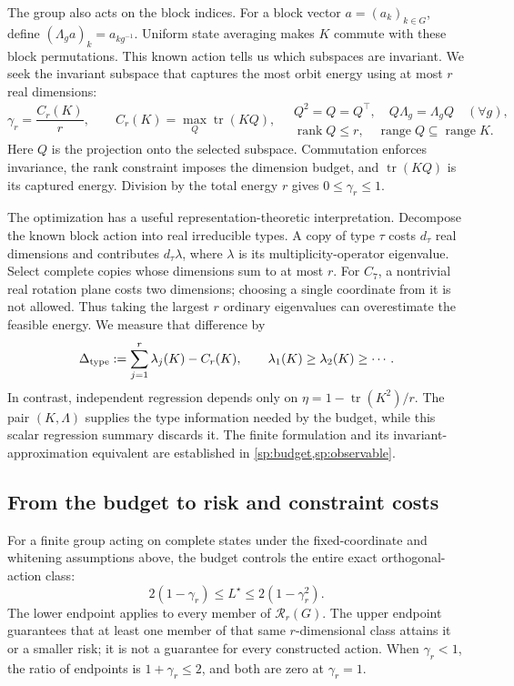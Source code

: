 The group also acts on the block indices. For a block vector $a=(a_k)_{k\in G}$, define $(\Lambda_g a)_k=a_{kg^{-1}}$. Uniform state averaging makes $K$ commute with these block permutations. This known action tells us which subspaces are invariant. We seek the invariant subspace that captures the most orbit energy using at most $r$ real dimensions:
\begin{equation}
 \gamma_r=\frac{C_r(K)}r,\qquad
 C_r(K)=\max_Q\operatorname{tr}(KQ),\quad
 \begin{gathered}
 Q^2=Q=Q^\top,\quad Q\Lambda_g=\Lambda_gQ\quad(\forall g),\\
 \operatorname{rank}Q\le r,\quad\operatorname{range}Q\subseteq\operatorname{range}K.
 \end{gathered}
 \label{eq:budget-main}
\end{equation}
Here $Q$ is the projection onto the selected subspace. Commutation enforces invariance, the rank constraint imposes the dimension budget, and $\operatorname{tr}(KQ)$ is its captured energy. Division by the total energy $r$ gives $0\le\gamma_r\le1$.

The optimization has a useful representation-theoretic interpretation. Decompose the known block action into real irreducible types. A copy of type $\tau$ costs $d_\tau$ real dimensions and contributes $d_\tau\lambda$, where $\lambda$ is its multiplicity-operator eigenvalue. Select complete copies whose dimensions sum to at most $r$. For $C_7$, a nontrivial real rotation plane costs two dimensions; choosing a single coordinate from it is not allowed. Thus taking the largest $r$ ordinary eigenvalues can overestimate the feasible energy. We measure that difference by
\[
 \Delta_{\rm type}:=\sum_{j=1}^{r}\lambda_j(K)-C_r(K),
 \qquad \lambda_1(K)\ge\lambda_2(K)\ge\cdots.
\]
In contrast, independent regression depends only on $\eta=1-\operatorname{tr}(K^2)/r$. The pair $(K,\Lambda)$ supplies the type information needed by the budget, while this scalar regression summary discards it. The finite formulation and its invariant-approximation equivalent are established in \cref{sp:budget,sp:observable}.

\subsection{From the budget to risk and constraint costs}
For a finite group acting on complete states under the fixed-coordinate and whitening assumptions above, the budget controls the entire exact orthogonal-action class:
\begin{equation}
 \boxed{2(1-\gamma_r)\le L^\star\le2(1-\gamma_r^2).}
 \label{eq:main-risk-bound}
\end{equation}
The lower endpoint applies to every member of $\mathcal R_r(G)$. The upper endpoint guarantees that at least one member of that same $r$-dimensional class attains it or a smaller risk; it is not a guarantee for every constructed action. When $\gamma_r<1$, the ratio of endpoints is $1+\gamma_r\le2$, and both are zero at $\gamma_r=1$.

